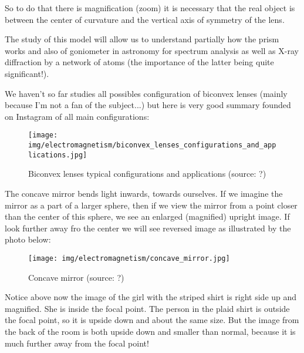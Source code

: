 	So to do that there is magnification (zoom) it is necessary that the real object is between the center of curvature and the vertical axis of symmetry of the lens.
	\begin{tcolorbox}[title=Remark,colframe=black,arc=10pt]
	The study of this model will allow us to understand partially how the prism works and also of goniometer in astronomy for spectrum analysis as well as X-ray diffraction by a network of atoms (the importance of the latter being quite significant!).
	\end{tcolorbox}
	We haven't so far studies all possibles configuration of biconvex lenses (mainly because I'm not a fan of the subject...) but here is very good summary founded on Instagram of all main configurations:
	\begin{figure}[H]
		\centering
		\texttt{[image: img/electromagnetism/biconvex\_lenses\_configurations\_and\_applications.jpg]}
		\caption[Biconvex lenses typical configurations and applications]{Biconvex lenses typical configurations and applications (source: ?)}
	\end{figure}	
	The concave mirror bends light inwards, towards ourselves. If we imagine the mirror as a part of a larger sphere, then if we view the mirror from a point closer than the center of this sphere, we see an enlarged (magnified) upright image. If look further away fro the center we will see reversed image as illustrated by the photo below:
	\begin{figure}[H]
		\centering
		\texttt{[image: img/electromagnetism/concave\_mirror.jpg]}
		\caption[Concave mirror]{Concave mirror (source: ?)}
	\end{figure}
	Notice above now the image of the girl with the striped shirt is right side up and magnified. She is inside the focal point. The person in the plaid shirt is outside the focal point, so it is upside down and about the same size. But the image from the back of the room is both upside down and smaller than normal, because it is much further away from the focal point!
	
